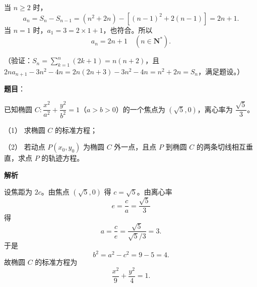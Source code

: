 \begin{answer}
当 $n\geqslant2$ 时，
\nopagebreak[4]
\[a_n=S_n-S_{n-1}=(n^2+2n)-[(n-1)^2+2(n-1)]=2n+1.\]
当 $n=1$ 时，$a_1=3=2\times1+1$，也符合。所以
\nopagebreak[4]
\[a_n=2n+1\quad(n\in\mathbf N^*).\]

（验证：$S_n=\sum_{k=1}^n(2k+1)=n(n+2)$，且 $2na_{n+1}-3n^2-4n=2n(2n+3)-3n^2-4n=n^2+2n=S_n$，满足题设。）



\end{answer}
\begin{answer}

\textbf{题目}：

已知椭圆 $C:\dfrac{x^2}{a^2}+\dfrac{y^2}{b^2}=1$（$a>b>0$）的一个焦点为 $(\sqrt5,0)$，离心率为 $\dfrac{\sqrt5}{3}$。

（1） 求椭圆 $C$ 的标准方程；

（2） 若动点 $P(x_0,y_0)$ 为椭圆 $C$ 外一点，且点 $P$ 到椭圆 $C$ 的两条切线相互垂直，求点 $P$ 的轨迹方程。

\textbf{解析}


设焦距为 $2c$。由焦点 $(\sqrt5,0)$ 得 $c=\sqrt5$。由离心率
\nopagebreak[4]
\[e=\frac ca=\frac{\sqrt5}{3}\]
得
\nopagebreak[4]
\[a=\frac{c}{e}=\frac{\sqrt5}{\sqrt5/3}=3.\]
于是
\nopagebreak[4]
\[b^2=a^2-c^2=9-5=4.\]
故椭圆 $C$ 的标准方程为
\nopagebreak[4]
\[\frac{x^2}{9}+\frac{y^2}{4}=1.\]



\end{answer}
